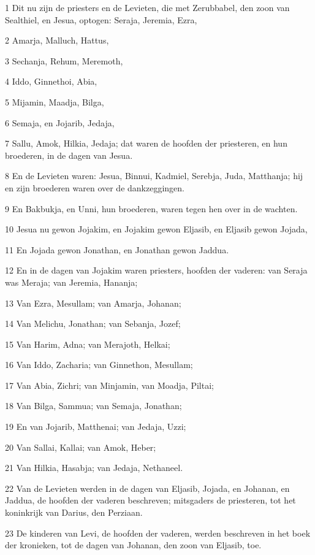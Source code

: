 \par 1 Dit nu zijn de priesters en de Levieten, die met Zerubbabel, den zoon van Sealthiel, en Jesua, optogen: Seraja, Jeremia, Ezra,
\par 2 Amarja, Malluch, Hattus,
\par 3 Sechanja, Rehum, Meremoth,
\par 4 Iddo, Ginnethoi, Abia,
\par 5 Mijamin, Maadja, Bilga,
\par 6 Semaja, en Jojarib, Jedaja,
\par 7 Sallu, Amok, Hilkia, Jedaja; dat waren de hoofden der priesteren, en hun broederen, in de dagen van Jesua.
\par 8 En de Levieten waren: Jesua, Binnui, Kadmiel, Serebja, Juda, Matthanja; hij en zijn broederen waren over de dankzeggingen.
\par 9 En Bakbukja, en Unni, hun broederen, waren tegen hen over in de wachten.
\par 10 Jesua nu gewon Jojakim, en Jojakim gewon Eljasib, en Eljasib gewon Jojada,
\par 11 En Jojada gewon Jonathan, en Jonathan gewon Jaddua.
\par 12 En in de dagen van Jojakim waren priesters, hoofden der vaderen: van Seraja was Meraja; van Jeremia, Hananja;
\par 13 Van Ezra, Mesullam; van Amarja, Johanan;
\par 14 Van Melichu, Jonathan; van Sebanja, Jozef;
\par 15 Van Harim, Adna; van Merajoth, Helkai;
\par 16 Van Iddo, Zacharia; van Ginnethon, Mesullam;
\par 17 Van Abia, Zichri; van Minjamin, van Moadja, Piltai;
\par 18 Van Bilga, Sammua; van Semaja, Jonathan;
\par 19 En van Jojarib, Matthenai; van Jedaja, Uzzi;
\par 20 Van Sallai, Kallai; van Amok, Heber;
\par 21 Van Hilkia, Hasabja; van Jedaja, Nethaneel.
\par 22 Van de Levieten werden in de dagen van Eljasib, Jojada, en Johanan, en Jaddua, de hoofden der vaderen beschreven; mitsgaders de priesteren, tot het koninkrijk van Darius, den Perziaan.
\par 23 De kinderen van Levi, de hoofden der vaderen, werden beschreven in het boek der kronieken, tot de dagen van Johanan, den zoon van Eljasib, toe.
